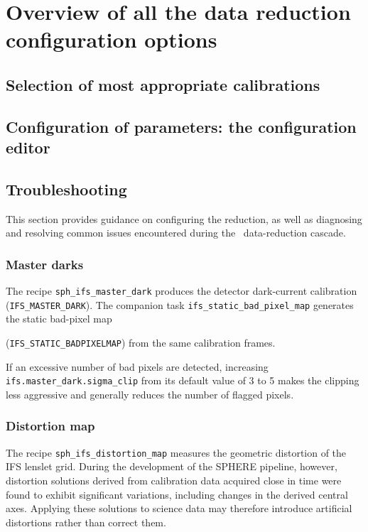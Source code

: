 \section{Overview of all the data reduction configuration options}
\label{sec:configuration_overview}

\subsection{Selection of most appropriate calibrations}



\subsection{Configuration of parameters: the configuration editor}
\label{sec:configuration_editor}


\clearpage
\subsection{Troubleshooting}

This section provides guidance on configuring the reduction, as well as
diagnosing and resolving common issues encountered during the
\instname\ data-reduction cascade.

\subsubsection{Master darks}
\label{sec:ifs_master_dark}

The recipe \texttt{sph\_ifs\_master\_dark} produces the detector dark-current
calibration (\texttt{IFS\_MASTER\_DARK}). The companion task
\texttt{ifs\_static\_bad\_pixel\_map} generates the static bad-pixel map

(\texttt{IFS\_STATIC\_BADPIXELMAP}) from the same calibration frames.

If an excessive number of bad pixels are detected, increasing
\texttt{ifs.master\_dark.sigma\_clip} from its default value of 3 to 5
makes the clipping less aggressive and generally reduces the number of
flagged pixels.

\subsubsection{Distortion map}
\label{sec:distortion_map}

The recipe \texttt{sph\_ifs\_distortion\_map} measures the geometric
distortion of the IFS lenslet grid. During the development of the SPHERE
pipeline, however, distortion solutions derived from calibration data
acquired close in time were found to exhibit significant variations,
including changes in the derived central axes. Applying these solutions to
science data may therefore introduce artificial distortions rather than
correct them.

